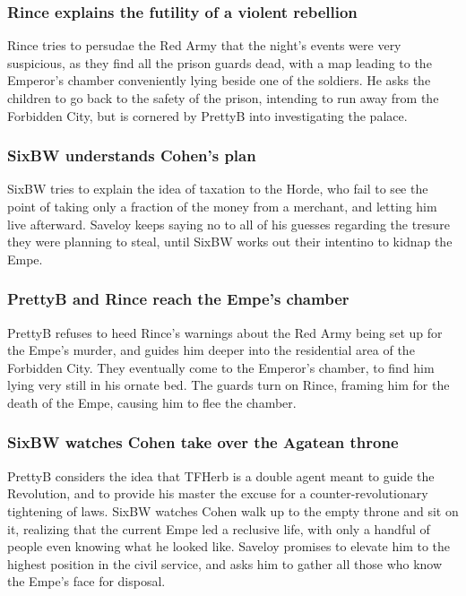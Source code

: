 \subsubsection{\Gls{Rince} explains the futility of a violent rebellion}
\Gls{Rince} tries to persudae the Red Army that the night's events were very suspicious, as they
find all the prison guards dead, with a map leading to the Emperor's chamber conveniently lying
beside one of the soldiers. He asks the children to go back to the safety of the prison, intending
to run away from the Forbidden City, but is cornered by \Gls{PrettyB} into investigating the
palace.

\subsubsection{\Gls{SixBW} understands \Gls{Cohen}'s plan}
\Gls{SixBW} tries to explain the idea of taxation to the Horde, who fail to see the point of taking
only a fraction of the money from a merchant, and letting him live afterward. \Gls{Saveloy} keeps
saying no to all of his guesses regarding the tresure they were planning to steal, until
\Gls{SixBW} works out their intentino to kidnap the \Gls{Empe}.

\subsubsection{\Gls{PrettyB} and \Gls{Rince} reach the \Gls{Empe}'s chamber}
\Gls{PrettyB} refuses to heed \Gls{Rince}'s warnings about the Red Army being set up for the
\Gls{Empe}'s murder, and guides him deeper into the residential area of the Forbidden City. They
eventually come to the Emperor's chamber, to find him lying very still in his ornate bed. The
guards turn on \Gls{Rince}, framing him for the death of the \Gls{Empe}, causing him to flee the
chamber.

\subsubsection{\Gls{SixBW} watches \Gls{Cohen} take over the Agatean throne}
\Gls{PrettyB} considers the idea that \Gls{TFHerb} is a double agent meant to guide the Revolution,
and to provide his master the excuse for a counter-revolutionary tightening of laws. \Gls{SixBW}
watches \Gls{Cohen} walk up to the empty throne and sit on it, realizing that the current \Gls{Empe}
led a reclusive life, with only a handful of people even knowing what he looked like. \Gls{Saveloy}
promises to elevate him to the highest position in the civil service, and asks him to gather all
those who know the \Gls{Empe}'s face for disposal.

